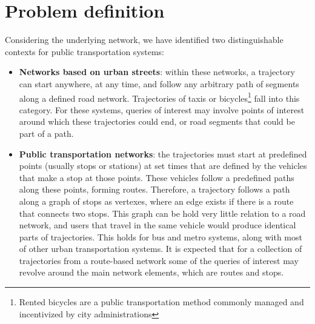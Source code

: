 \documentclass[a4paper,10pt,twoside]{book}
\begin{document}
	\section{Problem definition}
	\label{sec:pd}
	Considering the underlying network, we have identified two distinguishable contexts for public transportation systems:
	\begin{itemize}
	    \item \textbf{Networks based on urban streets}: within these networks, a trajectory can start anywhere, at any time, and follow any arbitrary path of segments along a defined road network.
	    Trajectories of taxis or bicycles\footnote{Rented bicycles are a public transportation method commonly managed and incentivized by city administrations} fall into this category. For these systems, queries of interest may involve points of interest around which these trajectories could end, or road segments that could be part of a path.
	    \item \textbf{Public transportation networks}: the trajectories must start at predefined points (usually stops or stations) at set times that are defined by the vehicles that make a stop at those points. These vehicles follow a predefined paths along these points, forming routes. Therefore, a trajectory follows a path along a graph of stops as vertexes, where an edge exists if there is a route that connects two stops. This graph can be hold very little relation to a road network, and users that travel in the same vehicle would produce identical parts of trajectories. This holds for bus and metro systems, along with most of other urban transportation systems. It is expected that for a collection of trajectories from a route-based network some of the queries of interest may revolve around the main network elements, which are routes and stops.
	\end{itemize}
	
\end{document}
